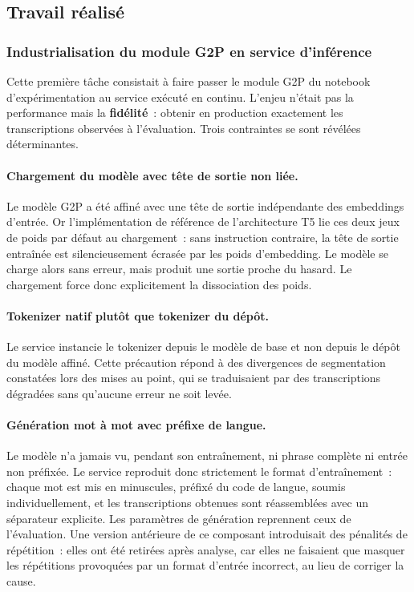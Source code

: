 \subsection{Travail réalisé}

\subsubsection{Industrialisation du module G2P en service d'inférence}
\label{ssec:ct-g2p}

Cette première tâche consistait à faire passer le module G2P du notebook
d'expérimentation au service exécuté en continu. L'enjeu n'était pas la performance
mais la \textbf{fidélité}~: obtenir en production exactement les transcriptions
observées à l'évaluation. Trois contraintes se sont révélées déterminantes.

\paragraph{Chargement du modèle avec tête de sortie non liée.}
Le modèle G2P a été affiné avec une tête de sortie  indépendante des
embeddings d'entrée. Or l'implémentation de référence de l'architecture T5 lie ces
deux jeux de poids par défaut au chargement~: sans instruction contraire, la tête de
sortie entraînée est silencieusement écrasée par les poids d'embedding. Le modèle se
charge alors sans erreur, mais produit une sortie proche du hasard. Le chargement
force donc explicitement la dissociation des poids.

\paragraph{Tokenizer natif plutôt que tokenizer du dépôt.}
Le service instancie le tokenizer depuis le modèle de base et non depuis le dépôt du
modèle affiné. Cette précaution répond à des divergences de segmentation constatées
lors des mises au point, qui se traduisaient par des transcriptions dégradées sans
qu'aucune erreur ne soit levée.

\paragraph{Génération mot à mot avec préfixe de langue.}
Le modèle n'a jamais vu, pendant son entraînement, ni phrase complète ni entrée non
préfixée. Le service reproduit donc strictement le format d'entraînement~: chaque mot
est mis en minuscules, préfixé du code de langue, soumis individuellement, et les
transcriptions obtenues sont réassemblées avec un séparateur explicite. Les
paramètres de génération reprennent ceux de l'évaluation. Une version antérieure de ce
composant introduisait des pénalités de répétition~: elles ont été retirées après
analyse, car elles ne faisaient que masquer les répétitions provoquées par un format
d'entrée incorrect, au lieu de corriger la cause.

